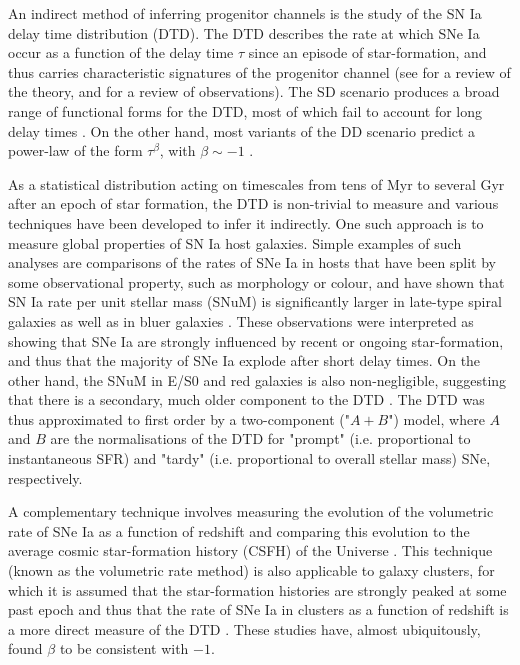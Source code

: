 \documentclass[fleqn,usenatbib]{mnras}
\begin{document}
An indirect method of inferring progenitor channels is the study of the SN Ia delay time distribution (DTD). The DTD describes the rate at which SNe Ia occur as a function of the delay time $\tau$ since an episode of star-formation, and thus carries characteristic signatures of the progenitor channel (see \citealt{Wang2012} for a review of the theory, and \citealt{Maoz2017} for a review of observations). The SD scenario produces a broad range of functional forms for the DTD, most of which fail to account for long delay times \citep{Graur2014}. On the other hand, most variants of the DD scenario predict a power-law of the form $\tau^{\beta}$, with $\beta \sim -1$ \citep[e.g][]{Ruiter2009,Mennekens2010}.

As a statistical distribution acting on timescales from tens of Myr to several Gyr after an epoch of star formation, the DTD is non-trivial to measure and various techniques have been developed to infer it indirectly. One such approach is to measure global properties of SN Ia host galaxies. Simple examples of such analyses are comparisons of the rates of SNe Ia in hosts that have been split by some observational property, such as morphology or colour, and have shown that SN Ia rate per unit stellar mass (SNuM) is significantly larger in late-type spiral galaxies as well as in bluer galaxies \citep[e.g.][]{Mannucci2005}. These observations were interpreted as showing that SNe Ia are strongly influenced by recent or ongoing star-formation, and thus that the majority of SNe Ia explode after short delay times. On the other hand, the SNuM in E/S0 and red galaxies is also non-negligible, suggesting that there is a secondary, much older component to the DTD \citep{Sullivan2006,Li2011a,Smith2012}. The DTD was thus approximated to first order by a two-component ("$A + B$") model, where $A$ and $B$ are the normalisations of the DTD for "prompt" (i.e. proportional to instantaneous SFR) and "tardy" (i.e. proportional to overall stellar mass) SNe, respectively.

A complementary technique involves measuring the evolution of the volumetric rate of SNe Ia as a function of redshift and comparing this evolution to the average cosmic star-formation history (CSFH) of the Universe \citep{Gal-Yam2004,Strolger2004,Dahlen2004,Dahlen2008, Graur2011,Graur2013, Rodney2014,Frohmaier2019}. This technique (known as the volumetric rate method) is also applicable to galaxy clusters, for which it is assumed that the star-formation histories are strongly peaked at some past epoch and thus that the rate of SNe Ia in clusters as a function of redshift is a more direct measure of the DTD \citep{Maoz2004,Maoz2010,Friedmann2018,Freundlich2021}. These studies have, almost ubiquitously, found $\beta$ to be consistent with $-1$.
\end{document}
